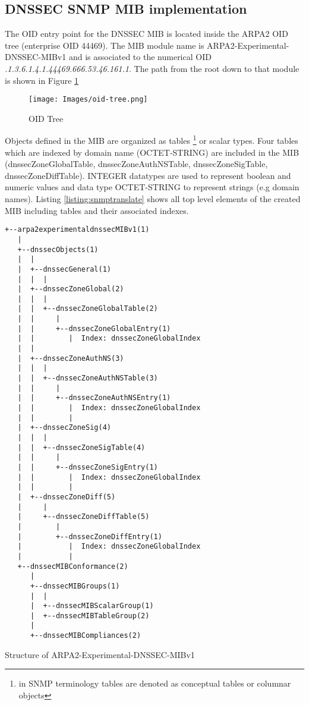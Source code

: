 \subsection{DNSSEC SNMP MIB implementation}
\label{section:dnssec-mib-implementation}
The OID entry point for the DNSSEC MIB is located inside the ARPA2 OID tree (enterprise OID 44469). The MIB module name is ARPA2-Experimental-DNSSEC-MIBv1 and is associated to the numerical OID \textit{.1.3.6.1.4.1.44469.666.53.46.161.1}. The path from the root down to that module is shown in Figure \ref{figure:oid-tree}

\begin{figure}[H]
\centering
\texttt{[image: Images/oid-tree.png]}
\caption{OID Tree}
\label{figure:oid-tree}
\end{figure}


Objects defined in the MIB are organized as tables \footnote{in SNMP terminology tables are denoted as conceptual tables or columnar objects} or scalar types. Four tables which are indexed by domain name (OCTET-STRING) are included in the MIB (dnssecZoneGlobalTable, dnssecZoneAuthNSTable, dnssecZoneSigTable, dnssecZoneDiffTable). INTEGER datatypes are used to represent boolean and numeric values and data type  OCTET-STRING to represent strings (e.g domain names). Listing \ref{listing:snmptranslate} shows all top level elements of the created MIB including tables and their associated indexes.

\begin{listing}
\small\begin{verbatim}
+--arpa2experimentaldnssecMIBv1(1)
   |
   +--dnssecObjects(1)
   |  |
   |  +--dnssecGeneral(1)
   |  |  |
   |  +--dnssecZoneGlobal(2)
   |  |  |
   |  |  +--dnssecZoneGlobalTable(2)
   |  |     |
   |  |     +--dnssecZoneGlobalEntry(1)
   |  |        |  Index: dnssecZoneGlobalIndex
   |  |
   |  +--dnssecZoneAuthNS(3)
   |  |  |
   |  |  +--dnssecZoneAuthNSTable(3)
   |  |     |
   |  |     +--dnssecZoneAuthNSEntry(1)
   |  |        |  Index: dnssecZoneGlobalIndex
   |  |        |
   |  +--dnssecZoneSig(4)
   |  |  |
   |  |  +--dnssecZoneSigTable(4)
   |  |     |
   |  |     +--dnssecZoneSigEntry(1)
   |  |        |  Index: dnssecZoneGlobalIndex
   |  |        |
   |  +--dnssecZoneDiff(5)
   |     |
   |     +--dnssecZoneDiffTable(5)
   |        |
   |        +--dnssecZoneDiffEntry(1)
   |           |  Index: dnssecZoneGlobalIndex
   |           |
   +--dnssecMIBConformance(2)
      |
      +--dnssecMIBGroups(1)
      |  |
      |  +--dnssecMIBScalarGroup(1)
      |  +--dnssecMIBTableGroup(2)
      |
      +--dnssecMIBCompliances(2)

\end{verbatim}
\normalsize
\caption{Structure of ARPA2-Experimental-DNSSEC-MIBv1}
\label{listing:snmptranslate}
\end{listing}

